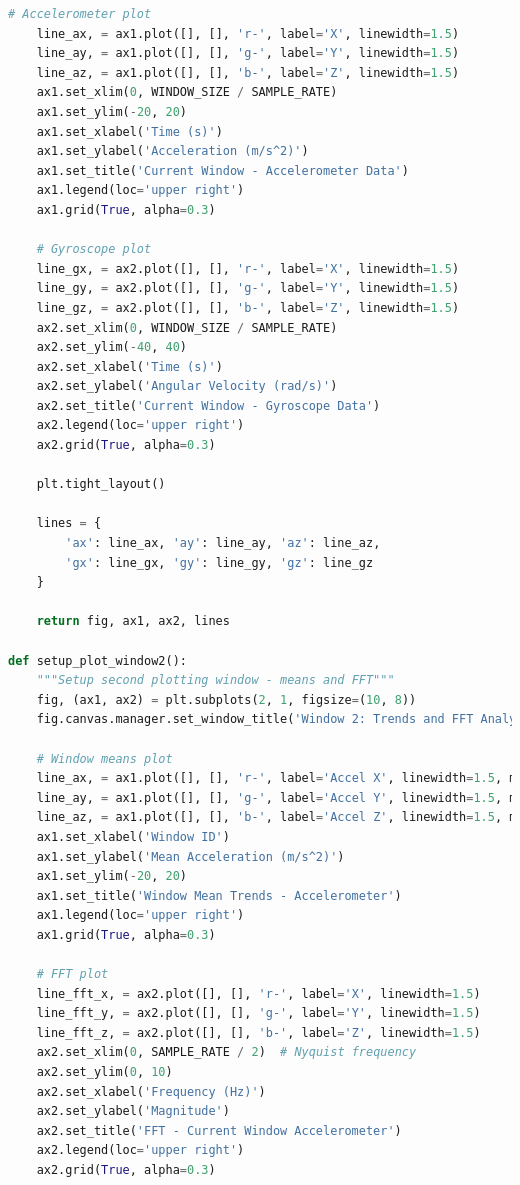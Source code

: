 \documentclass[conference]{IEEEtran}
\begin{document}
\begin{lstlisting}[language=Python]
    # Accelerometer plot
    line_ax, = ax1.plot([], [], 'r-', label='X', linewidth=1.5)
    line_ay, = ax1.plot([], [], 'g-', label='Y', linewidth=1.5)
    line_az, = ax1.plot([], [], 'b-', label='Z', linewidth=1.5)
    ax1.set_xlim(0, WINDOW_SIZE / SAMPLE_RATE)
    ax1.set_ylim(-20, 20)
    ax1.set_xlabel('Time (s)')
    ax1.set_ylabel('Acceleration (m/s^2)')
    ax1.set_title('Current Window - Accelerometer Data')
    ax1.legend(loc='upper right')
    ax1.grid(True, alpha=0.3)
    
    # Gyroscope plot
    line_gx, = ax2.plot([], [], 'r-', label='X', linewidth=1.5)
    line_gy, = ax2.plot([], [], 'g-', label='Y', linewidth=1.5)
    line_gz, = ax2.plot([], [], 'b-', label='Z', linewidth=1.5)
    ax2.set_xlim(0, WINDOW_SIZE / SAMPLE_RATE)
    ax2.set_ylim(-40, 40)
    ax2.set_xlabel('Time (s)')
    ax2.set_ylabel('Angular Velocity (rad/s)')
    ax2.set_title('Current Window - Gyroscope Data')
    ax2.legend(loc='upper right')
    ax2.grid(True, alpha=0.3)
    
    plt.tight_layout()
    
    lines = {
        'ax': line_ax, 'ay': line_ay, 'az': line_az,
        'gx': line_gx, 'gy': line_gy, 'gz': line_gz
    }
    
    return fig, ax1, ax2, lines

def setup_plot_window2():
    """Setup second plotting window - means and FFT"""
    fig, (ax1, ax2) = plt.subplots(2, 1, figsize=(10, 8))
    fig.canvas.manager.set_window_title('Window 2: Trends and FFT Analysis')
    
    # Window means plot
    line_ax, = ax1.plot([], [], 'r-', label='Accel X', linewidth=1.5, marker='o', markersize=3)
    line_ay, = ax1.plot([], [], 'g-', label='Accel Y', linewidth=1.5, marker='o', markersize=3)
    line_az, = ax1.plot([], [], 'b-', label='Accel Z', linewidth=1.5, marker='o', markersize=3)
    ax1.set_xlabel('Window ID')
    ax1.set_ylabel('Mean Acceleration (m/s^2)')
    ax1.set_ylim(-20, 20)
    ax1.set_title('Window Mean Trends - Accelerometer')
    ax1.legend(loc='upper right')
    ax1.grid(True, alpha=0.3)
    
    # FFT plot
    line_fft_x, = ax2.plot([], [], 'r-', label='X', linewidth=1.5)
    line_fft_y, = ax2.plot([], [], 'g-', label='Y', linewidth=1.5)
    line_fft_z, = ax2.plot([], [], 'b-', label='Z', linewidth=1.5)
    ax2.set_xlim(0, SAMPLE_RATE / 2)  # Nyquist frequency
    ax2.set_ylim(0, 10)
    ax2.set_xlabel('Frequency (Hz)')
    ax2.set_ylabel('Magnitude')
    ax2.set_title('FFT - Current Window Accelerometer')
    ax2.legend(loc='upper right')
    ax2.grid(True, alpha=0.3)
    

\end{lstlisting}
\end{document}
